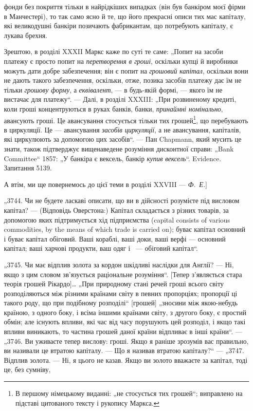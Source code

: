 \parcont{}  %
фонди без покриття тільки в найрідкіших випадках (він був
банкіром моєї фірми в Манчестері), то так само ясно й те, що
його прекрасні описи тих мас капіталу, які великодушні банкіри
позичають фабрикантам, що потребують капіталу, є лукава
брехня.

Зрештою, в розділі XXXII Маркс каже по суті те саме:
„Попит на засоби платежу є просто попит на \emph{перетворення в
гроші}, оскільки купці й виробники можуть дати добре забезпечення; він є попит на \emph{грошовий капітал},
оскільки вони не
дають такого забезпечення, оскільки, отже, позика засобів платежу дає їм не тільки \emph{грошову форму}, а
\emph{еквівалент}, — в будь-якій формі, — якого їм не вистачає для платежу“. — Далі,
в розділі XXXIII: „При розвиненому кредиті, коли гроші концентруються в руках банків, банки,
\emph{принаймні номінально}, авансують гроші. Це авансування стосується тільки тих грошей\footnote*{
В першому німецькому виданні: „не стосується тих грошей“; виправлено
на підставі цитованого тексту і рукопису Маркса. 
}, що перебувають
в циркуляції. Це — авансування \emph{засобів
циркуляції}, а не авансування, капіталів, які циркулюють за допомогою цих засобів“. — Пан Chapmann,
який мусить це знати,
також підтверджує вищенаведене розуміння дисконтної справи:
„Bank Committee“ 1857: „У банкіра є вексель, банкір \emph{купив вексель}“. Evidence. Запитання 5139.

А втім, ми ще повернемось до цієї теми в розділі
XXVIII — \emph{Ф.~Е.}]

„3744. Чи не будете ласкаві описати, що ви в дійсності розумієте під висловом капітал? — (Відповідь
Оверстона:) Капітал
складається з різних товарів, за допомогою яких підтримується
хід підприємства (capital consists of various commodities, by the
means of which trade is carried on); буває капітал основний і буває капітал обіговий. Ваші кораблі,
ваші доки, ваші верфі —
основний капітал; ваші харчові продукти, ваш одяг і~ — обіговий капітал“.

„3745. Чи має відплив золота за кордон шкідливі наслідки для
Англії? — Ні, якщо з цим словом зв’язується раціональне розуміння“. [Тепер з’являється стара теорія
грошей Рікардо]\dots{} „При
природному стані речей гроші всього світу розподіляються між
різними країнами світу в певних пропорціях; пропорції ці такого
роду, що при подібному розподілі“ [грошей] „зносини між якою-небудь країною, з одного боку, і всіма
іншими країнами світу, з другого боку, є простий обмін; але існують впливи, які час
від часу порушують цей розподіл, і якщо такі впливи виникають,
то частина грошей даної країни відпливає в інші країни“. — „3746.
Ви уживаєте тепер вислову: гроші. Якщо я раніше зрозумів вас
правильно, ви називали це втратою капіталу. — Що я називав
втратою капіталу?“ — „3747. Відплив золота. — Ні, я цього не
казав. Якщо ви золото вважаєте за капітал, тоді це, без сумніву,
\parbreak{}  %
